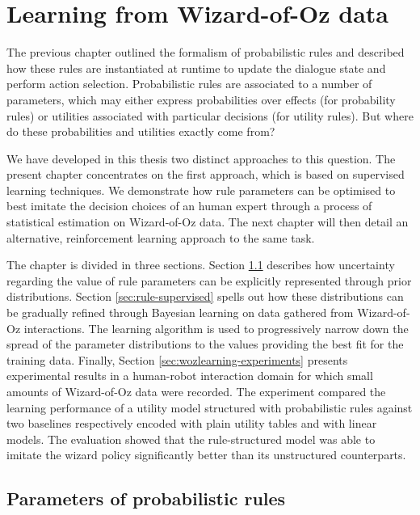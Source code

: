 
\chapter{Learning from Wizard-of-Oz data}
\label{chap:wozlearning}


The previous chapter outlined the formalism of probabilistic rules and described how these rules are instantiated at runtime to update the dialogue state and perform action selection. Probabilistic rules are associated to a number of parameters, which may either express probabilities over effects (for probability rules) or utilities associated with particular decisions (for utility rules). But where do these probabilities and utilities exactly come from?

We have developed in this thesis two distinct approaches to this question. The present chapter concentrates on the first approach, which is based on supervised learning techniques. We demonstrate how rule parameters can be optimised to best imitate the decision choices of an human expert through a process of statistical estimation on Wizard-of-Oz data. The next chapter will then detail an alternative, reinforcement learning approach to the same task.

The chapter is divided in three sections.  Section \ref{sec:rule-params} describes how uncertainty regarding the value of rule parameters can be explicitly represented through prior distributions. Section \ref{sec:rule-supervised} spells out how these distributions can be gradually refined through Bayesian learning on data gathered from Wizard-of-Oz interactions.  The learning algorithm  is used to progressively narrow down the spread of the parameter distributions to the values providing the best fit for the training data. Finally, Section \ref{sec:wozlearning-experiments} presents experimental results in a human-robot interaction domain for which small amounts of Wizard-of-Oz data were recorded. The experiment compared the learning performance of a utility model structured with probabilistic rules against two baselines respectively encoded with plain utility tables and with linear models. The evaluation showed that the rule-structured model was able to imitate the wizard policy significantly better than its unstructured counterparts.

\section{Parameters of probabilistic rules}
\label{sec:rule-params}

